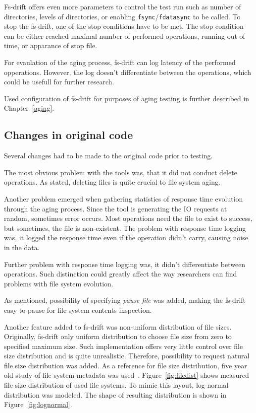 \documentclass[
  color, %
  table, %
  lof,   %
  lot,   %
]{fithesis3}
\begin{document}
Fs-drift offers even more parameters to control the test run such as number of directories, levels of directories, or enabling \texttt{fsync}/\texttt{fdatasync} to be called. To stop the fs-drift, one of the stop conditions have to be met. The stop condition can be either reached maximal number of performed operations, running out of time, or apparance of stop file.

For evaulation of the aging process, fs-drift can log latency of the performed opperations. However, the log doesn't differentiate between the operations, which could be usefull for further research.

Used configuration of fs-drift for purposes of aging testing is further described in Chapter~\ref{aging}.

\subsection{Changes in original code}
\label{text:fsdrift_changes}
Several changes had to be made to the original code prior to testing.

The most obvious problem with the tools was, that it did not conduct delete operations. As stated, deleting files is quite crucial to file system aging.

Another problem emerged when gathering statistics of response time evolution through the aging process. Since the tool is generating the IO requests at random, sometimes error occurs. Most operations need the file to exist to success, but sometimes, the file is non-existent. The problem with response time logging was, it logged the response time even if the operation didn't carry, causing noise in the data.

Further problem with response time logging was, it didn't differentiate between operations. Such distinction could greatly affect the way researchers can find problems with file system evolution.

As mentioned, possibility of specifying \emph{pause file} was added, making the fs-drift easy to pause for file system contents inspection.

Another feature added to fs-drift was non-uniform distribution of file sizes. Originally, fs-drift only uniform distribution to choose file size from zero to specified maximum size. Such implementation offers very little control over file size distribution and is quite unrealistic. Therefore, possibility to request natural file size distribution was added. As a reference for file size distribution, five year old study of file system metadata was used~\cite{agrawal2007five}. Figure~\ref{fig:filedist} shows measured file size distribution of used file systems. To mimic this layout, log-normal distribution was modeled. The shape of resulting distribution is shown in Figure~\ref{fig:lognormal}.
\end{document}
